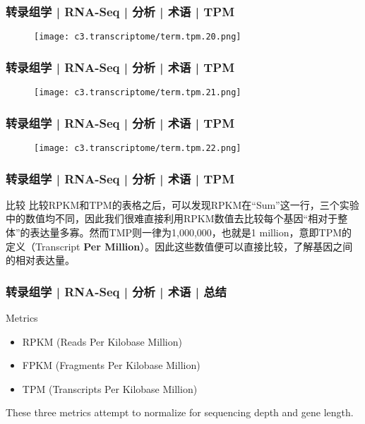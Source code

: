 \begin{frame}
  \frametitle{转录组学 | RNA-Seq | 分析 | 术语 | TPM}
  \begin{figure}
    \centering
    \texttt{[image: c3.transcriptome/term.tpm.20.png]}
  \end{figure}
\end{frame}

\begin{frame}
  \frametitle{转录组学 | RNA-Seq | 分析 | 术语 | TPM}
  \begin{figure}
    \centering
    \texttt{[image: c3.transcriptome/term.tpm.21.png]}
  \end{figure}
\end{frame}

\begin{frame}
  \frametitle{转录组学 | RNA-Seq | 分析 | 术语 | TPM}
  \begin{figure}
    \centering
    \texttt{[image: c3.transcriptome/term.tpm.22.png]}
  \end{figure}
\end{frame}

\begin{frame}
  \frametitle{转录组学 | RNA-Seq | 分析 | 术语 | TPM}
  \begin{block}{比较}
比较RPKM和TPM的表格之后，可以发现RPKM在“Sum”这一行，三个实验中的数值均不同，因此我们很难直接利用RPKM数值去比较每个基因“相对于整体”的表达量多寡。然而TMP则一律为1,000,000，也就是1 million，意即TPM的定义（Transcript \textbf{Per Million}）。因此这些数值便可以直接比较，了解基因之间的相对表达量。
  \end{block}
\end{frame}

\begin{frame}
  \frametitle{转录组学 | RNA-Seq | 分析 | 术语 | 总结}
  \begin{block}{Metrics}
    \begin{itemize}
      \item RPKM (Reads Per Kilobase Million)
      \item FPKM (Fragments Per Kilobase Million)
      \item TPM (Transcripts Per Kilobase Million)
    \end{itemize}
        These three metrics attempt to normalize for sequencing depth and gene length. 
  \end{block}
\end{frame}

